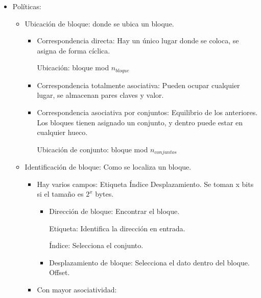 \documentclass[12pt, twoside, openright]{report} %
\begin{document}
    \begin{itemize}
    
    \item
      Políticas:

      \begin{itemize}
      
      \item
        Ubicación de bloque: donde se ubica un bloque.

        \begin{itemize}
        
        \item
          Correspondencia directa: Hay un único lugar donde se coloca,
          se asigna de forma cíclica.

          
            Ubicación: bloque mod \(n_{bloque}\)

            \item
          Correspondencia totalmente asociativa: Pueden ocupar cualquier
          lugar, se almacenan pares claves y valor.
        \item
          Correspondencia asociativa por conjuntos: Equilibrio de los
          anteriores. Los bloques tienen asignado un conjunto, y dentro
          puede estar en cualquier hueco.

          
            Ubicación de conjunto: bloque mod \(n_{conjuntos}\)

          \end{itemize}
      \item
        Identificación de bloque: Como se localiza un bloque.

        \begin{itemize}
        
        \item
          Hay varios campos: Etiqueta \textbar{} Índice \textbar{}
          Desplazamiento. Se toman x bits si el tamaño es \(2^x\) bytes.

          \begin{itemize}
          
          \item Dirección de bloque: Encontrar el bloque.

              Etiqueta: Identifica la dirección en entrada.

              Índice: Selecciona el conjunto.

          \item Desplazamiento de bloque: Selecciona el dato dentro del
            bloque. Offset.
          \end{itemize}
        \item
          Con mayor asociatividad:


\end{itemize}
\end{itemize}
\end{itemize}
\end{document}
